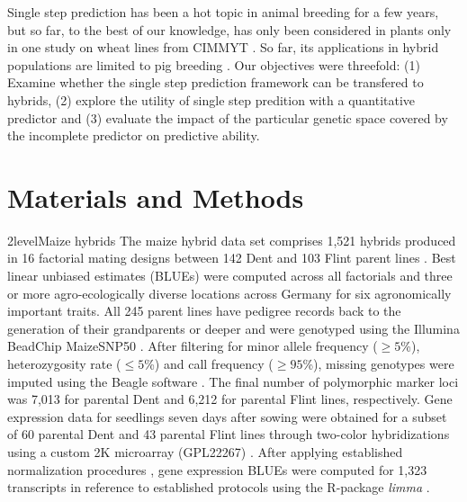 \documentclass[12pt,titlepage]{article}
\begin{document}
Single step prediction has been a hot topic in animal breeding for a few years,
but so far, to the best of our knowledge, has only been considered in plants
only in one study on wheat lines from CIMMYT \cite{Ashraf2016}. 
So far, its applications in hybrid populations are limited to pig breeding
\cite{Xiang2015,Xiang2016,Tusell2016}.
Our objectives were threefold: (1) Examine whether the single step prediction
framework can be transfered to hybrids, (2) explore the utility of single step 
predition with a quantitative predictor and (3) evaluate the impact of the
particular genetic space covered by the incomplete predictor on predictive
ability.










\section{Materials and Methods}
\Genetics2level{Maize hybrids}
The maize hybrid data set comprises 1,521 hybrids produced in 16 factorial
mating designs between 142 Dent and 103 Flint parent lines \cite{Westhues2017}. 
Best linear unbiased estimates (BLUEs) were computed across all factorials and 
three or more agro-ecologically diverse locations across Germany for six 
agronomically important traits.
All 245 parent lines have pedigree records back to the generation of their 
grandparents or deeper \cite{Westhues2017} and were genotyped using the Illumina 
BeadChip MaizeSNP50 \cite{Ganal2011}.
After filtering for minor allele frequency ($\geq 5$\%), heterozygosity rate
($\leq 5$\%) and call frequency ($\geq 95$\%), missing genotypes were imputed 
using the Beagle software \cite{Browning2009}.
The final number of polymorphic marker loci was 7,013 for parental Dent and
6,212 for parental Flint lines, respectively.
Gene expression data for seedlings seven days after sowing were obtained for a 
subset of 60 parental Dent and 43 parental Flint lines through two-color
hybridizations using a custom 2K microarray (GPL22267) \cite{Westhues2017}.
After applying established normalization procedures 
\cite{Smyth2003,Ritchie2007}, gene expression BLUEs were computed for 1,323 
transcripts in reference to established protocols 
\cite{Smyth2003,Ritchie2007,Frisch2010} using the R-package \textit{limma}
\cite{Ritchie2015a}.
\end{document}
